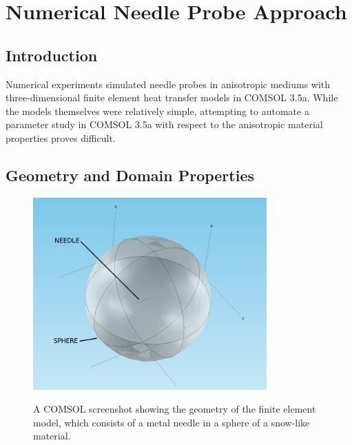 \chapter{Numerical Needle Probe Approach}
\label{sec:numerical-np}
\bigskip

\section{Introduction} 
\label{sec:numerical-np:introduction}

Numerical experiments simulated needle probes in anisotropic mediums with
three-dimensional finite element heat transfer models in COMSOL 3.5a. While the
models themselves were relatively simple, attempting to automate a parameter
study in COMSOL 3.5a with respect to the anisotropic material properties proves
difficult.

\section{Geometry and Domain Properties}
\label{sec:numerical-np:domain}


\begin{figure}[h]
\centering
\includegraphics[width=0.8\textwidth]{fig/domain_2.png}
\label{fig:domain}
\caption{A COMSOL screenshot showing the geometry of the finite element model, which consists of a metal needle in a sphere of a snow-like material.}
\end{figure}


